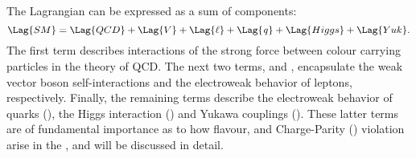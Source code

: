 The \sm Lagrangian can be expressed as a sum of components:
\begin{equation}
  \Lag{SM} = \Lag{QCD} + \Lag{V} + \Lag{\ell} + \Lag{\it q} + \Lag{Higgs} + \Lag{Yuk}.
  \label{eq:th:lag}
\end{equation}
The first term describes interactions of the strong force between colour carrying particles in the
theory of QCD.
The next two terms,  and \Lag{\ell}, encapsulate the weak vector boson self-interactions
and the electroweak behavior of leptons, respectively.
Finally, the remaining terms describe the electroweak behavior of quarks (), the Higgs
interaction () and
Yukawa couplings ().
These latter terms are of fundamental importance as to how flavour, and Charge-Parity (\CP)
violation
arise in the \sm, and will be discussed in detail.

